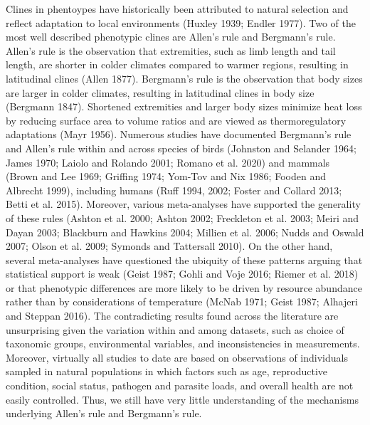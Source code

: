 \documentclass[]{article}
\begin{document}
Clines in phentoypes have historically been attributed to natural
selection and reflect adaptation to local environments (Huxley 1939;
Endler 1977). Two of the most well described phenotypic clines are
Allen's rule and Bergmann's rule. Allen's rule is the observation that
extremities, such as limb length and tail length, are shorter in colder
climates compared to warmer regions, resulting in latitudinal clines
(Allen 1877). Bergmann's rule is the observation that body sizes are
larger in colder climates, resulting in latitudinal clines in body size
(Bergmann 1847). Shortened extremities and larger body sizes minimize
heat loss by reducing surface area to volume ratios and are viewed as
thermoregulatory adaptations (Mayr 1956). Numerous studies have
documented Bergmann's rule and Allen's rule within and across species of
birds (Johnston and Selander 1964; James 1970; Laiolo and Rolando 2001;
Romano et al. 2020) and mammals (Brown and Lee 1969; Griffing 1974;
Yom-Tov and Nix 1986; Fooden and Albrecht 1999), including humans (Ruff
1994, 2002; Foster and Collard 2013; Betti et al. 2015). Moreover,
various meta-analyses have supported the generality of these rules
(Ashton et al. 2000; Ashton 2002; Freckleton et al. 2003; Meiri and
Dayan 2003; Blackburn and Hawkins 2004; Millien et al. 2006; Nudds and
Oswald 2007; Olson et al. 2009; Symonds and Tattersall 2010). On the
other hand, several meta-analyses have questioned the ubiquity of these
patterns arguing that statistical support is weak (Geist 1987; Gohli and
Voje 2016; Riemer et al. 2018) or that phenotypic differences are more
likely to be driven by resource abundance rather than by considerations
of temperature (McNab 1971; Geist 1987; Alhajeri and Steppan 2016). The
contradicting results found across the literature are unsurprising given
the variation within and among datasets, such as choice of taxonomic
groups, environmental variables, and inconsistencies in measurements.
Moreover, virtually all studies to date are based on observations of
individuals sampled in natural populations in which factors such as age,
reproductive condition, social status, pathogen and parasite loads, and
overall health are not easily controlled. Thus, we still have very
little understanding of the mechanisms underlying Allen's rule and
Bergmann's rule.
\end{document}
